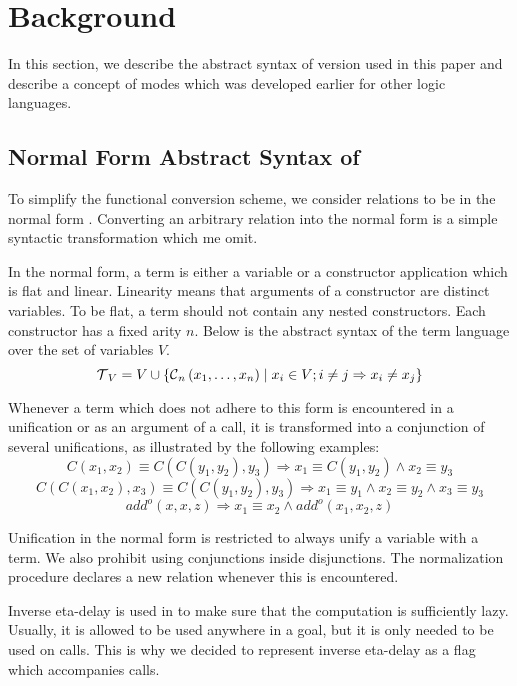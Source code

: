 \section{Background}

In this section, we describe the abstract syntax of \mk version used in this paper and describe a concept of modes which was developed earlier for other logic languages.

\subsection{Normal Form Abstract Syntax of \mk}

To simplify the functional conversion scheme, we consider \mk relations to be in the normal form .
Converting an arbitrary \mk relation into the normal form is a simple syntactic transformation which me omit.

In the normal form, a term is either a variable or a constructor application which is flat and linear.
Linearity means that arguments of a constructor are distinct variables.
To be flat, a term should not contain any nested constructors.
Each constructor has a fixed arity $n$.
Below is the abstract syntax of the term language over the set of variables $V$.
\[  \operatorname{\mathcal{T}}_{V} = V \cup \{\operatorname{\mathcal{C}}_{n}\left( x_1, \ldots, x_{n} \right) \mid x_{i}\in V; i \neq j \Rightarrow x_i \neq x_j\} \]

Whenever a term which does not adhere to this form is encountered in a unification or as an argument of a call, it is transformed into a conjunction of several unifications, as illustrated by the following examples:
\[ C\left( x_1, x_2 \right) \equiv C\left( C\left( y_1, y_2 \right), y_3 \right) \Rightarrow x_1 \equiv C\left( y_1, y_2 \right) \land x_2 \equiv y_3   \]
\[ C\left( C\left( x_1, x_2 \right), x_3 \right) \equiv C\left( C\left( y_1, y_2 \right), y_3 \right) \Rightarrow x_1 \equiv y_1 \land x_2 \equiv y_2 \land x_3 \equiv y_3   \]
\[add^o\left( x, x, z \right) \Rightarrow x_1 \equiv x_2 \land add^o\left( x_1, x_2, z \right) \]

Unification in the normal form is restricted to always unify a variable with a term.
We also prohibit using conjunctions inside disjunctions.
The normalization procedure declares a new relation whenever this is encountered.

Inverse eta-delay is used in \mk to make sure that the computation is sufficiently lazy.
Usually, it is allowed to be used anywhere in a goal, but it is only needed to be used on calls.
This is why we decided to represent inverse eta-delay as a flag which accompanies calls.

